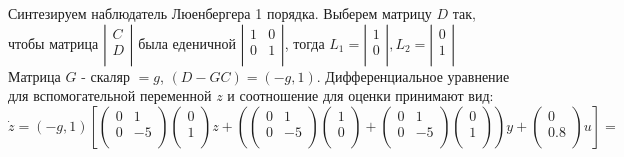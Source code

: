 \documentclass[preprint,russian,a5paper,10pt,twoside,mediummath]{ncc}
\begin{document}
Синтезируем наблюдатель Люенбергера 1 порядка. Выберем матрицу $D$ так, чтобы матрица $\left| \begin{matrix}
   C  \\
   D  \\
\end{matrix} \right|$ была еденичной $\left| \begin{matrix}
   1 & 0  \\
   0 & 1  \\
\end{matrix} \right|$, тогда ${{L}_{1}}=\left| \begin{matrix}
   1  \\
   0  \\
\end{matrix} \right|,{{L}_{2}}=\left| \begin{matrix}
   0  \\
   1  \\
\end{matrix} \right|$ Матрица $G$ - скаляр $=g$, $(D-GC)=(-g,1).$
Дифференциальное уравнение для вспомогательной переменной $z$ и соотношение для оценки принимают вид: \[\dot{z}=(-g,1)\left[ \left( \begin{matrix}
   0 & 1  \\
   0 & -5  \\
\end{matrix} \right)\left( \begin{matrix}
   0  \\
   1  \\
\end{matrix} \right)z+\left( \left( \begin{matrix}
   0 & 1  \\
   0 & -5  \\
\end{matrix} \right)\left( \begin{matrix}
   1  \\
   0  \\
\end{matrix} \right)+\left( \begin{matrix}
   0 & 1  \\
   0 & -5  \\
\end{matrix} \right)\left( \begin{matrix}
   0  \\
   1  \\
\end{matrix} \right) \right)y+\left( \begin{matrix}
   0  \\
   0.8  \\
\end{matrix} \right)u \right]=\]   
\end{document}
